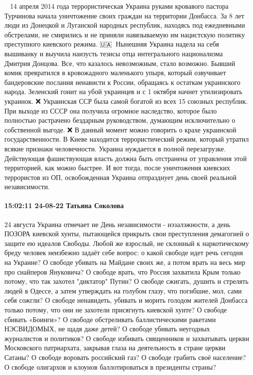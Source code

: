 🏴‍☠️🔥14 апреля 2014 года террористическая Украина руками кровавого пастора Турчинова начала уничтожение своих граждан на территории Донбасса. За 8 лет люди из Донецкой и Луганской народных республик, находясь под ежедневными обстрелами, не смирились и не приняли навязываемую им нацистскую политику преступного киевского режима.
🇺🇦🏴‍☠️Нынешняя Украина надела на себя вышиванку и выучила наизусть тезисы отца интегрального национализма Дмитрия Донцова. Все, что казалось невозможным, стало возможно. Бывший комик превратился в кровожадного маленького упыря, который озвучивает бандеровские послания ненависти к России, обращаясь к остаткам украинского народа. Зеленский гонит на убой украинцев и с 1 октября начнет утилизировать украинок.
❌ Украинская ССР была самой богатой из всех 15 союзных республик. При выходе из СССР она получила огромное наследство, которое было полностью растрачено бездарным руководством, думающим исключительно о собственной выгоде.
❌ В данный момент можно говорить о крахе украинской государственности. В Киеве находится террористический режим, который утратил всякие признаки человечности. Украина нуждается в полной перезагрузке. Действующая фашиствующая власть должна быть отстранена от управления этой территорией, как можно быстрее. И вот тогда, после уничтожения киевских террористов из ОП, освобожденная Украина отпразднует день своей реальной независимости.


\paragraph{15:02:11 24-08-22 Татьяна Соколова}

24 августа Украина отмечает не День независимости - нэзалэжности, а день ПОЗОРА киевской хунты, пытающейся прикрыть свои преступления демагогией о защите ею идеалов Свободы. Любой же взрослый, не склонный к наркотическому бреду человек неизбежно задаёт себе вопрос: о какой свободе идет речь сегодня на Украине?
О свободе убивать на Майдане своих же, а потом врать на весь мир про снайперов Януковича?
О свободе врать, что Россия захватила Крым только потому, что так захотел "диктатор" Путин?
О свободе сжигать, душить и стрелять людей в Одессе, а затем утверждать на голубом глазу, что погибшие, мол, сами себя сожгли?
О свободе ненавидеть, убивать и морить голодом жителей Донбасса только потому, что они не захотели присягнуть киевской хунте?
О свободе сбивать «Боинги»?
О свободе обстреливать баллистическими ракетами НЭСВИДОМЫХ, не щадя даже детей?
О свободе убивать неугодных журналистов и политиков?
О свободе избивать священников и захватывать церкви Московского патриархата, закрывая глаза на деятельность в стране церкви Сатаны?
О свободе воровать российский газ?
О свободе грабить своё население?
О свободе олигархов и клоунов баллотироваться в президенты страны?
